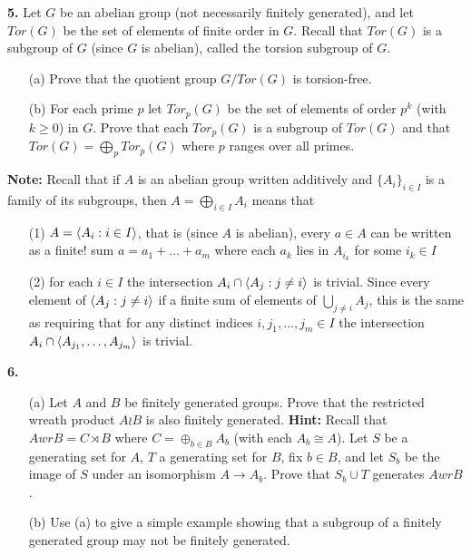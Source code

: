 \documentclass[12pt]{amsart}
\begin{document}
\skv
{\bf 5.} Let $G$ be an abelian group (not necessarily finitely generated), and
let $Tor(G)$ be the set of elements of finite order in $G$. Recall that
$Tor(G)$ is a subgroup of $G$ (since $G$ is abelian), called the torsion subgroup of $G$.
\begin{itemize}
\item[(a)] Prove that the quotient group $G/Tor(G)$ is torsion-free.
\item[(b)] For each prime $p$ let $Tor_p(G)$ be the set of elements of order $p^k$ (with $k\geq 0$)
in $G$. Prove that each $Tor_p(G)$ is a subgroup of $Tor(G)$ and that $Tor(G)=\bigoplus_p Tor_p(G)$ where $p$ ranges over all primes.
\end{itemize}
{\bf Note:} Recall that if $A$ is an abelian group written additively and $\{A_i\}_{i\in I}$ is a family of its subgroups, then $A=\bigoplus_{i\in I} A_i$
means that
\begin{itemize}
\item[(1)] $A={\langle} A_i: i\in I{\rangle}$, that is (since $A$ is abelian), every $a\in A$ can be written as a finite! sum $a=a_1+\ldots+ a_m$
where each $a_k$ lies in $A_{i_k}$ for some $i_k\in I$ 
\item[(2)] for each $i\in I$ the intersection $A_i\cap {\langle} A_j: j\neq i{\rangle}$ is trivial. Since every element of ${\langle} A_j: j\neq i{\rangle}$
if a finite sum of elements of $\bigcup_{j\neq i}A_j$, this is the same as requiring that for any distinct indices $i,j_1,\ldots, j_m\in I$
the intersection $A_i\cap {\langle} A_{j_1},\ldots, A_{j_m}{\rangle}$ is trivial.
\end{itemize}
{\bf 6.} 
\begin{itemize}
\item[(a)] Let $A$ and $B$ be finitely generated groups. Prove that the restricted wreath product $A \wr B$
is also finitely generated.
{\bf Hint:} Recall that $A wr B=C\rtimes B$ where $C=\oplus_{b\in B}A_b$ (with each $A_b\cong A$). Let $S$
be a generating set for $A$, $T$ a generating set for $B$, fix $b\in B$, and let $S_b$ be the image
of $S$ under an isomorphism $A\to A_b$. Prove that $S_b\cup T$ generates $A wr B$.
\item[(b)] Use (a) to give a simple example showing that a subgroup of a finitely generated group
may not be finitely generated.
\end{itemize}
\end{document}
